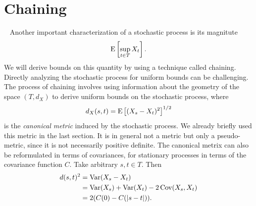 \section{Chaining}~\label{sec:chaining}
Another important characterization of a stochastic process is its magnitute
\[
    \operatorname*{E}\left[\sup_{t \in T} X_{t}\right].
\]
We will derive bounds on this quantity by using a technique called chaining.
Directly analyzing the stochastic process for uniform bounds can be challenging.
The process of chaining involves using information about the geometry of the space \((T,d_{X})\) to derive uniform bounds on the stochastic process, where 
\[ d_{X}(s,t) = \operatorname*{E}\left[(X_{s}-X_{t})^2\right]^{1/2} \] 
is the \textit{canonical metric} induced by the stochastic process.
We already briefly used this metric in the last section.
It is in general not a metric but only a pseudo-metric, since it is not necessarily positive definite.
The canonical metrix can also be reformulated in terms of covariances, for stationary processes in terms of the covariance function \(C\).
Take arbitrary \( s,t \in T \). Then
\begin{align*}
    d(s,t)^2 &= \operatorname{Var}(X_{s}-X_{t}) \\
    &= \operatorname{Var}(X_{s}) + \operatorname{Var}(X_{t}) - 2 \operatorname{Cov}(X_{s},X_{t}) \\
    &= 2(C(0)-C(\lvert s-t \rvert)).
\end{align*}

